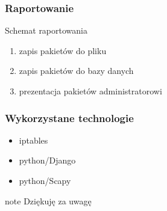 \documentclass{beamer}
\begin{document}
\begin{frame}
\frametitle{Raportowanie}
	\begin{block}{Schemat raportowania}
		\begin{enumerate}
			\item zapis pakietów do pliku
			\item zapis pakietów do bazy danych
			\item prezentacja pakietów administratorowi
		\end{enumerate}
	\end{block}
\end{frame}
\begin{frame}
	\frametitle{Wykorzystane technologie}
		\begin{itemize}
			\item iptables
			\item python/Django
			\item python/Scapy
		\end{itemize}
\end{frame}
\begin{frame}
        \begin{beamercolorbox}[center,shadow=true,rounded=true,]{note} 
        \Huge{Dziękuję za uwagę}
        \end{beamercolorbox}	
\end{frame}
\end{document}

